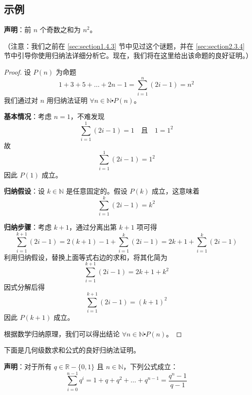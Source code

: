\subsection{示例}

\begin{example}[奇数之和是平方数]

    \textbf{声明}：前 $n$ 个奇数之和为 $n^2$。

    （注意：我们之前在 \ref{sec:section1.4.3} 节中见过这个谜题，并在 \ref{sec:section2.3.4} 节中引导你使用归纳法详细分析它。现在，我们将在这里给出该命题的良好证明。）
\end{example}

\begin{proof}
    设 $P(n)$ 为命题
    \[1+3+5+ \dots +2n-1 = \sum_{i=1}^n (2i-1) = n^2\]
    我们通过对 $n$ 用归纳法证明 $\forall n \in \mathbb{N} \centerdot P(n)$。

    \textbf{基本情况}：考虑 $n=1$，不难发现
    \[\sum_{i=1}^1 (2i-1) = 1 \quad \text{且} \quad 1=1^2\]
    故
    \[\sum_{i=1}^1 (2i-1) = 1^2\]
    因此 $P(1)$ 成立。

    \textbf{归纳假设}：设 $k \in \mathbb{N}$ 是任意固定的。假设 $P(k)$ 成立，这意味着
    \[\sum_{i=1}^k (2i-1) = k^2\]

    \textbf{归纳步骤}：考虑 $k+1$，通过分离出第 $k+1$ 项可得
    \[\sum_{i=1}^{k+1} (2i-1) = 2(k + 1) - 1 + \sum_{i=1}^k (2i-1) = 2k + 1 + \sum_{i=1}^k (2i-1)\]
    利用归纳假设，替换上面等式右边的求和，将其化简为
    \[\sum_{i=1}^{k+1} (2i-1) = 2k+1+k^2\]
    因式分解后得
    \[\sum_{i=1}^{k+1} (2i-1) = (k+1)^2\]
    因此 $P(k+1)$ 成立。

    根据数学归纳原理，我们可以得出结论 $\forall n \in \mathbb{N} \centerdot P(n)$。
\end{proof}

下面是几何级数求和公式的良好归纳法证明。\\

\begin{example}[几何级数求和公式]
    
    \textbf{声明}：对于所有 $q \in \mathbb{R}-\{0,1\}$ 且 $n \in \mathbb{N}$，下列公式成立：
    \[\sum_{i=0}^{n-1}q^i = 1+q+q^2+\dots+q^{n-1} = \frac{q^n-1}{q-1}\]
\end{example}

